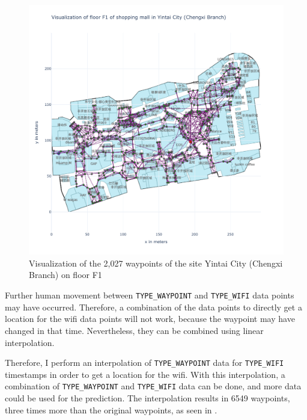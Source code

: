 \begin{figure}[h!]
    \centering
    \includegraphics[scale=0.6]{images/whole_floor_visualization_wo_interpolated.pdf}
    \caption{Visualization of the 2,027 waypoints of the site Yintai City (Chengxi Branch) on floor F1}
    \label{fig:vis-wo-interpolated}
\end{figure}

Further human movement between \texttt{TYPE\_WAYPOINT} and \texttt{TYPE\_WIFI} data points may have occurred.
Therefore, a combination of the data points to directly get a location for the \ac{wifi} data points will not work, because the waypoint may have changed in that time.
Nevertheless, they can be combined using linear interpolation.

Therefore, I perform an interpolation of \texttt{TYPE\_WAYPOINT} data for \texttt{TYPE\_WIFI} timestamps in order to get a location for the \ac{wifi}.
With this interpolation, a combination of \texttt{TYPE\_WAYPOINT} and \texttt{TYPE\_WIFI} data can be done, and more data could be used for the prediction.
The interpolation results in 6549 waypoints, three times more than the original waypoints, as seen in .

